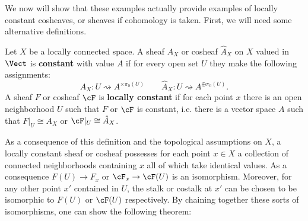 We now will show that these examples actually provide examples of locally constant cosheaves, or sheaves if cohomology is taken. First, we will need some alternative definitions.

\begin{defn}
	Let $X$ be a locally connected space. A sheaf $A_X$ or cosheaf $\hat{A}_X$ on $X$ valued in $\Vect$ is \textbf{constant} with value $A$ if for every open set $U$ they make the following assignments:
	\[
	A_X: U \rightsquigarrow A^{\times \pi_0(U)} \qquad \hat{A}_X: U \rightsquigarrow A^{\oplus \pi_0(U)}.
	\]
	A sheaf $F$ or cosheaf $\cF$ is \textbf{locally constant} if for each point $x$ there is an open neighborhood $U$ such that $F$ or $\cF$ is constant, i.e. there is a vector space $A$ such that $F|_U\cong A_X$ or $\cF|_U\cong \hat{A}_X$.
\end{defn}

As a consequence of this definition and the topological assumptions on $X$, a locally constant sheaf or cosheaf possesses for each point $x\in X$ a collection of connected neighborhoods containing $x$ all of which take identical values. As a consequence $F(U)\to F_x$ or $\cF_x \to \cF(U)$ is an isomorphism. Moreover, for any other point $x'$ contained in $U$, the stalk or costalk at $x'$ can be chosen to be isomorphic to $F(U)$ or $\cF(U)$ respectively. By chaining together these sorts of isomorphisms, one can show the following theorem:


